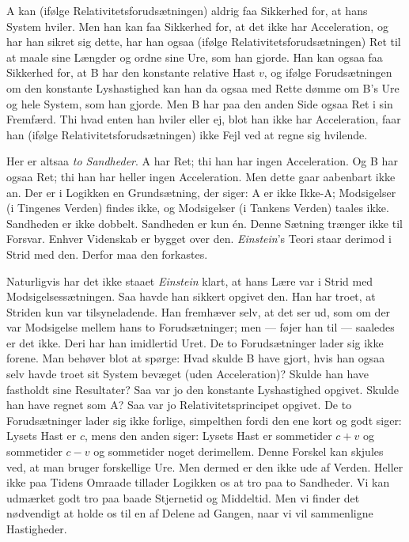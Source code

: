 \documentclass[12pt,a4paper]{article}
\newcommand{\opage}[1]{\marginnote{\footnotesize\textit{[#1]}}}
\begin{document}
A kan (ifølge Relativitetsforudsætningen) aldrig faa Sikkerhed for, at hans
System hviler. Men han kan faa Sikkerhed for, at det ikke har Acceleration,
og har han sikret sig dette, har han ogsaa (ifølge
Relativitetsforudsætningen) Ret til at maale sine Længder og ordne sine
Ure, som han gjorde. Han kan ogsaa faa Sikkerhed for, at B har den
konstante relative Hast $v$, og ifølge Forudsætningen om den konstante
Lyshastighed kan han da ogsaa med Rette dømme om B's Ure og hele System,
som han gjorde. Men B har paa den
\opage{15} anden Side ogsaa Ret i sin Fremfærd. Thi hvad enten han hviler eller ej,
blot han ikke har Acceleration, faar han (ifølge
Relativitetsforudsætningen) ikke Fejl ved at regne sig hvilende.

Her er altsaa \emph{to Sandheder}. A har Ret; thi han har ingen
Acceleration. Og B har ogsaa Ret; thi han har heller ingen Acceleration.
Men dette gaar aabenbart ikke an. Der er i Logikken en Grundsætning, der
siger: A er ikke Ikke-A; Modsigelser (i Tingenes Verden) findes ikke, og
Modsigelser (i Tankens Verden) taales ikke. Sandheden er ikke dobbelt.
Sandheden er kun én. Denne Sætning trænger ikke til Forsvar. Enhver
Videnskab er bygget over den. \emph{Einstein}'s Teori staar derimod i Strid
med den. Derfor maa den forkastes.

Naturligvis har det ikke staaet \emph{Einstein} klart, at hans Lære var i
Strid med Modsigelsessætningen. Saa havde han sikkert opgivet den. Han har
troet, at Striden kun var tilsyneladende. Han fremhæver selv, at det ser
ud, som om der var Modsigelse mellem hans to Forudsætninger; men --- føjer
han til --- saaledes er det ikke. Deri har han imidlertid Uret. De to
Forudsætninger lader sig ikke forene. Man behøver blot at spørge: Hvad
skulde B have gjort, hvis han ogsaa selv havde troet sit System bevæget
(uden Acceleration)? Skulde han have fastholdt sine Resultater? Saa var jo
den konstante Lyshastighed opgivet. Skulde han have regnet som A? Saa var
jo \guillemotright Relativitetsprincipet\guillemotleft{} opgivet. De to
Forudsætninger lader sig ikke forlige, simpelthen fordi den ene kort og
godt siger: Lysets Hast er $c$, mens den anden siger: Lysets Hast er
sommetider $c + v$ og sommetider $c - v$ og sommetider noget derimellem.
Denne Forskel kan skjules ved, at man bruger forskellige Ure. Men dermed er
den ikke ude af Verden. Heller ikke paa Tidens Omraade tillader Logikken os
at tro paa to Sandheder. Vi kan udmærket godt tro paa baade Stjernetid og
Middeltid. Men vi finder det nødvendigt at holde os til en af Delene ad
Gangen, naar vi vil sammenligne Hastigheder.
\end{document}
